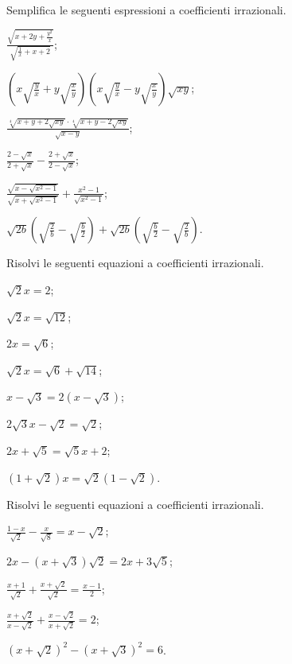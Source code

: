 \begin{esercizio}[\Ast]
 \label{ese:2.100}
Semplifica le seguenti espressioni a coefficienti irrazionali.
 \begin{multicols}{2}
 \begin{enumeratea}
 \item $\frac{\sqrt{x+2y+\frac{y^{2}}{x}}}{\sqrt{\frac{1}{x}+x+2}}$;
 \item $\left(x\sqrt{\frac{y}{x}}+y\sqrt{\frac{x}{y}}\right)\left(x\sqrt{\frac{y}{x}}-y\sqrt{\frac{x}{y}}\right)\sqrt{xy}$;
 \item $\frac{\sqrt[4]{x+y+2\sqrt{xy}}\cdot\sqrt[4]{x+y-2\sqrt{xy}}}{\sqrt{x-y}}$;
 \item $\frac{2-\sqrt{x}}{2+\sqrt{x}}-\frac{2+\sqrt{x}}{2-\sqrt{x}}$;
 \item $\frac{\sqrt{x-\sqrt{x^{2}-1}}}{\sqrt{x+\sqrt{x^{2}-1}}}+\frac{x^{2}-1}{\sqrt{x^{2}-1}}$;
 \item $\sqrt{2b}\left(\sqrt{\frac{2}{b}}-\sqrt{\frac{b}{2}} \right)+\sqrt{2b}\left(\sqrt{\frac{b}{2}}-\sqrt{\frac{2}{b}} \right)$.
 \end{enumeratea}
 \end{multicols}
\end{esercizio}

\begin{esercizio}[\Ast]
 \label{ese:2.101}
Risolvi le seguenti equazioni a coefficienti irrazionali.
 \begin{multicols}{2}
 \begin{enumeratea}
 \item $\sqrt 2x=2$;
 \item $\sqrt 2x=\sqrt{12}$;
 \item $2x=\sqrt 6$;
 \item $\sqrt 2x=\sqrt 6+\sqrt{14}$;
 \item $x-\sqrt 3=2\left(x-\sqrt 3\right)$;
 \item $2\sqrt 3x-\sqrt 2=\sqrt 2$;
 \item $2x+\sqrt 5=\sqrt 5x+2$;
 \item $(1+\sqrt 2)x=\sqrt 2(1-\sqrt 2)$.
 \end{enumeratea}
 \end{multicols}
\end{esercizio}

\begin{esercizio}[\Ast]
 \label{ese:2.102}
Risolvi le seguenti equazioni a coefficienti irrazionali.
 \begin{multicols}{2}
 \begin{enumeratea}
 \item $\frac{1-x}{\sqrt 2}-\frac x{\sqrt 8}=x-\sqrt 2$;
 \item $2x-\left(x+\sqrt 3\right)\sqrt 2=2x+3\sqrt 5$;
 \item $\frac{x+1}{\sqrt 2}+\frac{x+\sqrt 2}{\sqrt 2}=\frac{x-1} 2$;
 \item $\frac{x+\sqrt 2}{x-\sqrt 2}+\frac{x-\sqrt 2}{x+\sqrt 2}=2$;
 \item $(x+\sqrt 2)^2-(x+\sqrt 3)^2=6$.
 \end{enumeratea}
 \end{multicols}
\end{esercizio}

